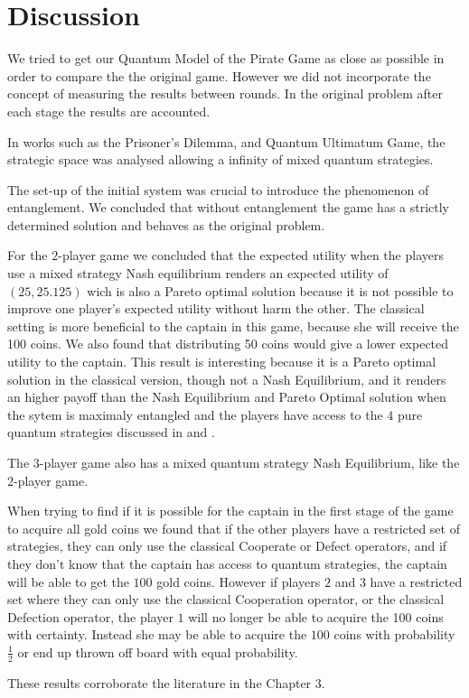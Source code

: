 \clearpage
\section{Discussion}
\label{subsec:3playergame:discution}



We tried to get our Quantum Model of the Pirate Game as close as possible in order to compare the the original game. However we did not incorporate the concept of measuring the results between rounds. In the original problem after each stage the results are accounted. 

In works such as the Prisoner's Dilemma\cite{Letters2002}\cite{Eisert2008}, and Quantum Ultimatum Game\cite{Fra2011}, the strategic space was analysed allowing a infinity of mixed quantum strategies.

The set-up of the initial system was crucial to introduce the phenomenon of entanglement. We concluded that without entanglement the game has a strictly determined solution and behaves as the original problem.

For the $2$-player game we concluded that the expected utility when the players use a mixed strategy Nash equilibrium renders an expected utility of $(25, 25.125)$ wich is also a Pareto optimal solution because it is not possible to improve one player's expected utility without harm the other. The classical setting is more beneficial to the captain in this game, because she will receive the 100 coins. We also found that distributing 50 coins would give a lower expected utility to the captain. This result is interesting because it is a Pareto optimal solution in the classical version, though not a Nash Equilibrium, and it renders an higher payoff than the Nash Equilibrium and Pareto Optimal solution when the sytem is maximaly entangled and the players have access to the $4$ pure quantum strategies discussed in \cite{Du} and \cite{Letters2002}. 

The $3$-player game also has a mixed quantum strategy Nash Equilibrium, like the $2$-player game. 

When trying to find if it is possible for the captain in the first stage of the game to acquire all gold coins we found that if the other players have a restricted set of strategies, they can only use the classical Cooperate or Defect operators, and if they don't know that the captain has access to quantum strategies, the captain will be able to get the $100$ gold coins. However if players $2$ and $3$ have a restricted set where they can only use the classical Cooperation operator, or the classical Defection operator, the player $1$ will no longer be able to acquire the 100 coins with certainty. Instead she may be able to acquire the $100$ coins with probability $\frac{1}{2}$ or end up thrown off board with equal probability.

These results corroborate the literature in the Chapter 3.


 






